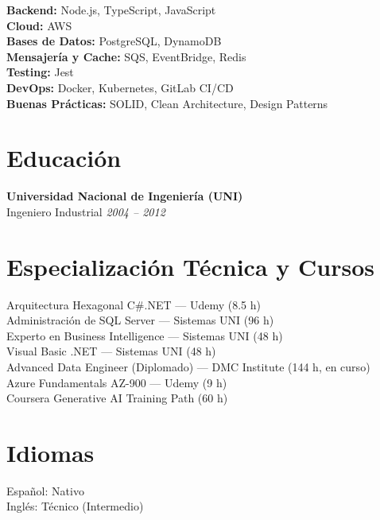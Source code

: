 \documentclass[11pt,a4paper]{article}
\begin{document}
\textbf{Backend:} Node.js, TypeScript, JavaScript\\
\textbf{Cloud:} AWS\\
\textbf{Bases de Datos:} PostgreSQL, DynamoDB\\
\textbf{Mensajería y Cache:} SQS, EventBridge, Redis\\
\textbf{Testing:} Jest\\
\textbf{DevOps:} Docker, Kubernetes, GitLab CI/CD\\
\textbf{Buenas Prácticas:} SOLID, Clean Architecture, Design Patterns

\vspace{6pt}

\section*{Educación}

\textbf{Universidad Nacional de Ingeniería (UNI)}\\
Ingeniero Industrial \hfill \textit{2004 – 2012}

\vspace{6pt}

\section*{Especialización Técnica y Cursos}

Arquitectura Hexagonal C\#.NET — Udemy (8.5 h)\\
Administración de SQL Server — Sistemas UNI (96 h)\\
Experto en Business Intelligence — Sistemas UNI (48 h)\\
Visual Basic .NET — Sistemas UNI (48 h)\\
Advanced Data Engineer (Diplomado) — DMC Institute (144 h, en curso)\\
Azure Fundamentals AZ-900 — Udemy (9 h)\\
Coursera Generative AI Training Path (60 h)


\section*{Idiomas}

Español: Nativo\\
Inglés: Técnico (Intermedio)
\end{document}
